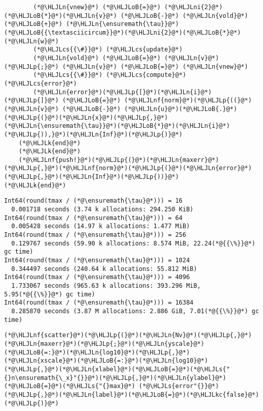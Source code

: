 \documentclass[12pt,a4paper]{article}
\newcommand{\HLJLk}[1]{\textcolor[RGB]{148,91,176}{\textbf{#1}}}
\newcommand{\HLJLkc}[1]{\textcolor[RGB]{59,151,46}{\textit{#1}}}
\newcommand{\HLJLn}[1]{#1}
\newcommand{\HLJLnf}[1]{\textcolor[RGB]{66,102,213}{#1}}
\newcommand{\HLJLs}[1]{\textcolor[RGB]{201,61,57}{#1}}
\newcommand{\HLJLni}[1]{\textcolor[RGB]{59,151,46}{#1}}
\newcommand{\HLJLoB}[1]{\textcolor[RGB]{102,102,102}{\textbf{#1}}}
\newcommand{\HLJLp}[1]{#1}
\newcommand{\HLJLcs}[1]{\textcolor[RGB]{153,153,119}{\textit{#1}}}
\begin{document}
\begin{lstlisting}
        (*@\HLJLn{vnew}@*) (*@\HLJLoB{=}@*) (*@\HLJLni{2}@*)(*@\HLJLoB{*}@*)(*@\HLJLn{v}@*) (*@\HLJLoB{-}@*) (*@\HLJLn{vold}@*) (*@\HLJLoB{+}@*) (*@\HLJLn{\ensuremath{\tau}}@*)(*@\HLJLoB{{\textasciicircum}}@*)(*@\HLJLni{2}@*)(*@\HLJLoB{*}@*)(*@\HLJLn{w}@*) 
        (*@\HLJLcs{{\#}}@*) (*@\HLJLcs{update}@*)
        (*@\HLJLn{vold}@*) (*@\HLJLoB{=}@*) (*@\HLJLn{v}@*)(*@\HLJLp{;}@*) (*@\HLJLn{v}@*) (*@\HLJLoB{=}@*) (*@\HLJLn{vnew}@*)
        (*@\HLJLcs{{\#}}@*) (*@\HLJLcs{compute}@*) (*@\HLJLcs{error}@*)
        (*@\HLJLn{error}@*)(*@\HLJLp{[}@*)(*@\HLJLn{i}@*)(*@\HLJLp{]}@*) (*@\HLJLoB{=}@*) (*@\HLJLnf{norm}@*)(*@\HLJLp{((}@*)(*@\HLJLn{v}@*) (*@\HLJLoB{-}@*) (*@\HLJLn{u}@*)(*@\HLJLoB{.}@*)(*@\HLJLp{(}@*)(*@\HLJLn{x}@*)(*@\HLJLp{,}@*)(*@\HLJLn{\ensuremath{\tau}}@*)(*@\HLJLoB{*}@*)(*@\HLJLn{i}@*)(*@\HLJLp{)),}@*)(*@\HLJLn{Inf}@*)(*@\HLJLp{)}@*)
    (*@\HLJLk{end}@*)
    (*@\HLJLk{end}@*)
    (*@\HLJLnf{push!}@*)(*@\HLJLp{(}@*)(*@\HLJLn{maxerr}@*)(*@\HLJLp{,}@*)(*@\HLJLnf{norm}@*)(*@\HLJLp{(}@*)(*@\HLJLn{error}@*)(*@\HLJLp{,}@*)(*@\HLJLn{Inf}@*)(*@\HLJLp{))}@*)
(*@\HLJLk{end}@*)
\end{lstlisting}

\begin{lstlisting}
Int64(round(tmax / (*@\ensuremath{\tau}@*))) = 16
  0.001718 seconds (3.74 k allocations: 294.250 KiB)
Int64(round(tmax / (*@\ensuremath{\tau}@*))) = 64
  0.005428 seconds (14.97 k allocations: 1.477 MiB)
Int64(round(tmax / (*@\ensuremath{\tau}@*))) = 256
  0.129767 seconds (59.90 k allocations: 8.574 MiB, 22.24(*@{{\%}}@*) gc time)
Int64(round(tmax / (*@\ensuremath{\tau}@*))) = 1024
  0.344497 seconds (240.64 k allocations: 55.812 MiB)
Int64(round(tmax / (*@\ensuremath{\tau}@*))) = 4096
  1.733067 seconds (965.63 k allocations: 393.296 MiB, 5.95(*@{{\%}}@*) gc time)
Int64(round(tmax / (*@\ensuremath{\tau}@*))) = 16384
  8.285870 seconds (3.87 M allocations: 2.886 GiB, 7.01(*@{{\%}}@*) gc time)
\end{lstlisting}


\begin{lstlisting}
(*@\HLJLnf{scatter}@*)(*@\HLJLp{(}@*)(*@\HLJLn{Nv}@*)(*@\HLJLp{,}@*)(*@\HLJLn{maxerr}@*)(*@\HLJLp{;}@*)(*@\HLJLn{yscale}@*)(*@\HLJLoB{=:}@*)(*@\HLJLn{log10}@*)(*@\HLJLp{,}@*)(*@\HLJLn{xscale}@*)(*@\HLJLoB{=:}@*)(*@\HLJLn{log10}@*)(*@\HLJLp{,}@*)(*@\HLJLn{xlabel}@*)(*@\HLJLoB{=}@*)(*@\HLJLs{"{}n\ensuremath{\_x}"{}}@*)(*@\HLJLp{,}@*)(*@\HLJLn{ylabel}@*)(*@\HLJLoB{=}@*)(*@\HLJLs{"{}max}@*) (*@\HLJLs{error"{}}@*)(*@\HLJLp{,}@*)(*@\HLJLn{label}@*)(*@\HLJLoB{=}@*)(*@\HLJLkc{false}@*)(*@\HLJLp{)}@*)
\end{lstlisting}
\end{document}
